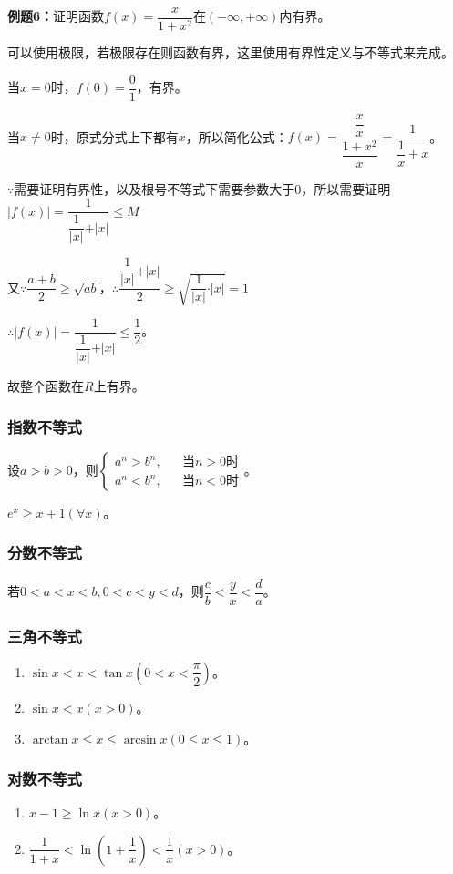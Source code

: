 \documentclass[UTF8, 12pt]{ctexart}
\begin{document}
\textbf{例题6：}证明函数$f(x)=\dfrac{x}{1+x^2}$在$(-\infty,+\infty)$内有界。

可以使用极限，若极限存在则函数有界，这里使用有界性定义与不等式来完成。

当$x=0$时，$f(0)=\dfrac{0}{1}$，有界。

当$x\neq 0$时，原式分式上下都有$x$，所以简化公式：$f(x)=\dfrac{\dfrac{x}{x}}{\dfrac{1+x^2}{x}}=\dfrac{1}{\dfrac{1}{x}+x}$。

$\because$需要证明有界性，以及根号不等式下需要参数大于0，所以需要证明$\vert f(x)\vert=\dfrac{1}{\dfrac{1}{\vert x\vert}+\vert x\vert}\leqslant M$

又$\because\dfrac{a+b}{2}\geqslant\sqrt{ab}$，$\therefore \dfrac{\dfrac{1}{\vert x\vert}+\vert x\vert}{2}\geqslant\sqrt{\dfrac{1}{\vert x\vert}\cdot\vert x\vert}=1$

$\therefore\vert f(x)\vert=\dfrac{1}{\dfrac{1}{\vert x\vert}+\vert x\vert}\leqslant\dfrac{1}{2}$。

故整个函数在$R$上有界。

\subsubsection{指数不等式}

设$a>b>0$，则$
\left\{
\begin{array}{lcl}
    a^n>b^n,   &  & \text{当}n>0\text{时} \\
    a^n<b^n, &  & \text{当}n<0\text{时}
\end{array}
\right.$。

$e^x\geqslant x+1(\forall x)$。

\subsubsection{分数不等式}

若$0<a<x<b,0<c<y<d$，则$\dfrac{c}{b}<\dfrac{y}{x}<\dfrac{d}{a}$。

\subsubsection{三角不等式}

\begin{enumerate}
    \item $\sin x<x<\tan x(0<x<\dfrac{\pi}{2})$。
    \item $\sin x<x(x>0)$。
    \item $\arctan x\leqslant x\leqslant\arcsin x(0\leqslant x\leqslant 1)$。
\end{enumerate}

\subsubsection{对数不等式}

\begin{enumerate}
    \item $x-1\geqslant\ln x(x>0)$。
    \item $\dfrac{1}{1+x}<\ln(1+\dfrac{1}{x})<\dfrac{1}{x}(x>0)$。
\end{enumerate}
\end{document}
